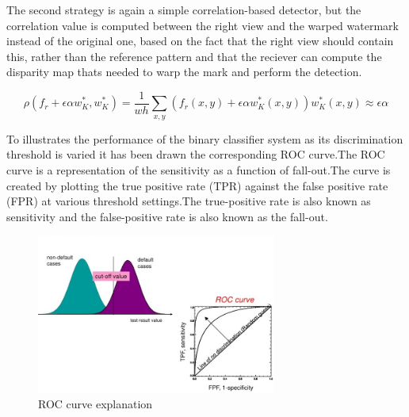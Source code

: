 The second strategy is again a simple correlation-based detector, but the correlation value is computed between the right view and the warped watermark instead of the original one, based on the fact that the right view should contain this, rather than the reference pattern and that the reciever can compute the disparity map thats needed to warp the mark and perform the detection.

$$\rho(f_{r}+\epsilon\alpha w_{K}^{*},w_{K}^{*})= \frac{1}{wh}\sum_{x,y}(f_{r}(x,y)+\epsilon\alpha w_{K}^{*}(x,y))w_{K}^{*}(x,y)\approx\epsilon\alpha $$

To illustrates the performance of the binary classifier system as its discrimination threshold is varied it has been drawn the corresponding ROC curve.\newline  The ROC curve is a representation of the sensitivity as a function of fall-out.\newline  The curve is created by plotting the true positive rate (TPR) against the false positive rate (FPR) at various threshold settings.\newline The true-positive rate is also known as sensitivity and the false-positive rate is also known as the fall-out.\newline  
\begin{figure}[h!]
\centering
\includegraphics[width=0.7\textwidth]{./img/roc.jpg}
\caption{\small{ROC curve explanation}}
\label{fig:roc}
\end{figure}

